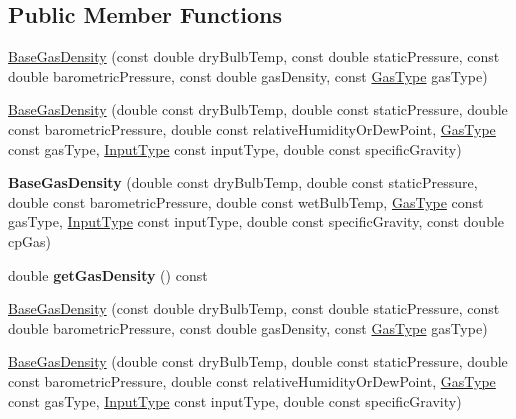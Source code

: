\subsection*{Public Member Functions}
\begin{DoxyCompactItemize}
\item 
\hyperlink{class_base_gas_density_a84089ddd9d29649d83a7b150b711b989}{Base\+Gas\+Density} (const double dry\+Bulb\+Temp, const double static\+Pressure, const double barometric\+Pressure, const double gas\+Density, const \hyperlink{class_base_gas_density_afb215e48f6193462521b7e8d47306ed3}{Gas\+Type} gas\+Type)
\item 
\hyperlink{class_base_gas_density_a0d53c40eecc4aad87c8fef1cfed1b614}{Base\+Gas\+Density} (double const dry\+Bulb\+Temp, double const static\+Pressure, double const barometric\+Pressure, double const relative\+Humidity\+Or\+Dew\+Point, \hyperlink{class_base_gas_density_afb215e48f6193462521b7e8d47306ed3}{Gas\+Type} const gas\+Type, \hyperlink{class_base_gas_density_a54f846cc4683a49d3904a40fe2986772}{Input\+Type} const input\+Type, double const specific\+Gravity)
\item 
\mbox{\label{class_base_gas_density_a08fc6e441bfec806ea73a9e37be60d92}} 
{\bfseries Base\+Gas\+Density} (double const dry\+Bulb\+Temp, double const static\+Pressure, double const barometric\+Pressure, double const wet\+Bulb\+Temp, \hyperlink{class_base_gas_density_afb215e48f6193462521b7e8d47306ed3}{Gas\+Type} const gas\+Type, \hyperlink{class_base_gas_density_a54f846cc4683a49d3904a40fe2986772}{Input\+Type} const input\+Type, double const specific\+Gravity, const double cp\+Gas)
\item 
\mbox{\label{class_base_gas_density_a1cbf2591aecb384afd5843f0e4a62a4e}} 
double {\bfseries get\+Gas\+Density} () const
\item 
\hyperlink{class_base_gas_density_a84089ddd9d29649d83a7b150b711b989}{Base\+Gas\+Density} (const double dry\+Bulb\+Temp, const double static\+Pressure, const double barometric\+Pressure, const double gas\+Density, const \hyperlink{class_base_gas_density_afb215e48f6193462521b7e8d47306ed3}{Gas\+Type} gas\+Type)
\item 
\hyperlink{class_base_gas_density_a0d53c40eecc4aad87c8fef1cfed1b614}{Base\+Gas\+Density} (double const dry\+Bulb\+Temp, double const static\+Pressure, double const barometric\+Pressure, double const relative\+Humidity\+Or\+Dew\+Point, \hyperlink{class_base_gas_density_afb215e48f6193462521b7e8d47306ed3}{Gas\+Type} const gas\+Type, \hyperlink{class_base_gas_density_a54f846cc4683a49d3904a40fe2986772}{Input\+Type} const input\+Type, double const specific\+Gravity)

\end{DoxyCompactItemize}

